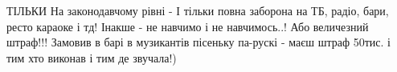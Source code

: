 \begin{itemize}

ТІЛЬКИ На законодавчому рівні - І тільки повна заборона на ТБ, радіо, бари, ресто
караоке і тд! Інакше - не навчимо і не навчимось..! Або величезний штраф!!!
Замовив в барі в музикантів пісеньку па-рускі - маєш штраф 50тис. і тим хто
виконав і тим де звучала!)


\end{itemize} %

